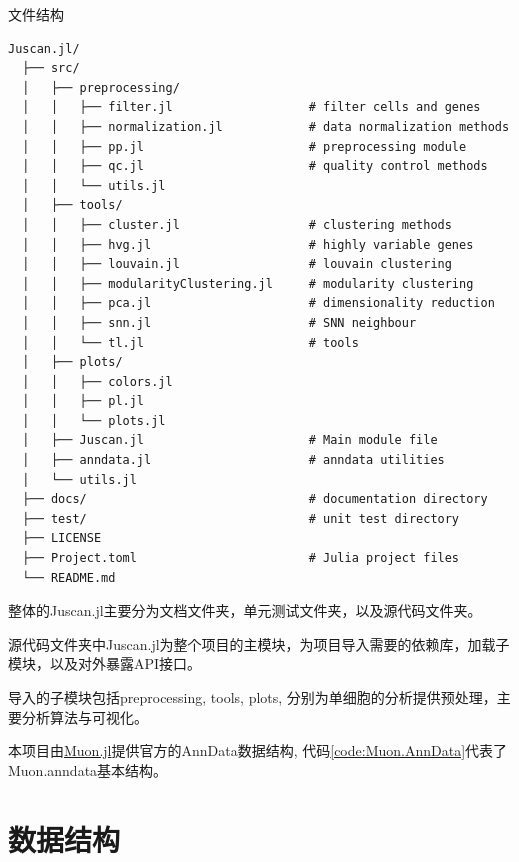 \begin{fancybox}{文件结构}
\begin{lstlisting}[numbers=none]
  Juscan.jl/
  ├── src/
  │   ├── preprocessing/
  │   │   ├── filter.jl                   # filter cells and genes
  │   │   ├── normalization.jl            # data normalization methods
  │   │   ├── pp.jl                       # preprocessing module
  │   │   ├── qc.jl                       # quality control methods
  │   │   └── utils.jl
  │   ├── tools/
  │   │   ├── cluster.jl                  # clustering methods
  │   │   ├── hvg.jl                      # highly variable genes
  │   │   ├── louvain.jl                  # louvain clustering
  │   │   ├── modularityClustering.jl     # modularity clustering
  │   │   ├── pca.jl                      # dimensionality reduction
  │   │   ├── snn.jl                      # SNN neighbour
  │   │   └── tl.jl                       # tools 
  │   ├── plots/
  │   │   ├── colors.jl
  │   │   ├── pl.jl
  │   │   └── plots.jl
  │   ├── Juscan.jl                       # Main module file
  │   ├── anndata.jl                      # anndata utilities
  │   └── utils.jl
  ├── docs/                               # documentation directory
  ├── test/                               # unit test directory
  ├── LICENSE
  ├── Project.toml                        # Julia project files
  └── README.md
\end{lstlisting}
\end{fancybox}

整体的Juscan.jl主要分为文档文件夹，单元测试文件夹，以及源代码文件夹。

源代码文件夹中Juscan.jl为整个项目的主模块，为项目导入需要的依赖库，加载子模块，以及对外暴露API接口。

导入的子模块包括preprocessing, tools, plots, 分别为单细胞的分析提供预处理，主要分析算法与可视化。

本项目由\href{https://github.com/scverse/Muon.jl}{Muon.jl}提供官方的AnnData数据结构, 代码\ref{code:Muon.AnnData}代表了Muon.anndata基本结构。

\section{数据结构}

